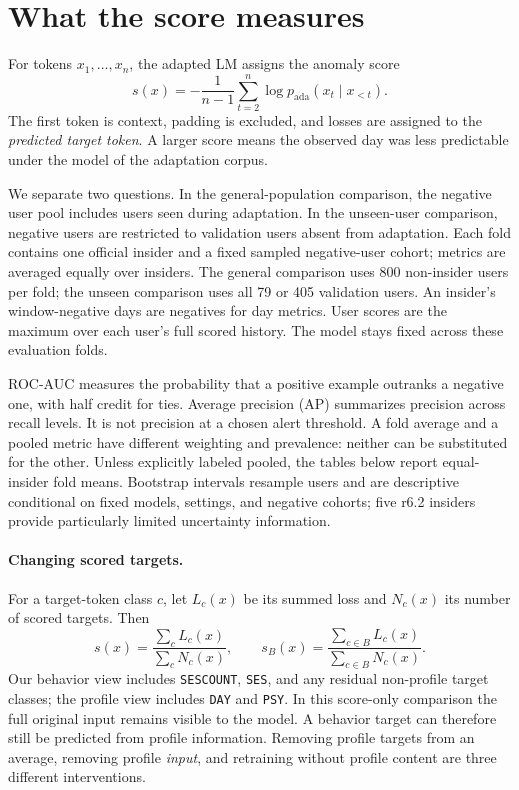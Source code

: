 \section{What the score measures}
\label{sec:evaluation}
For tokens $x_1,\ldots,x_n$, the adapted LM assigns the anomaly score
\begin{equation}
 s(x)=-\frac{1}{n-1}\sum_{t=2}^{n}\log p_{\mathrm{ada}}(x_t\mid x_{<t}).
\end{equation}
The first token is context, padding is excluded, and losses are assigned to the
\emph{predicted target token}. A larger score means the observed day was less
predictable under the model of the adaptation corpus.

We separate two questions. In the general-population comparison, the negative
user pool includes users seen during adaptation. In the unseen-user comparison,
negative users are restricted to validation users absent from adaptation. Each
fold contains one official insider and a fixed sampled negative-user cohort;
metrics are averaged equally over insiders. The general comparison uses 800
non-insider users per fold; the unseen comparison uses all 79 or 405 validation
users. An insider's window-negative days are negatives for day metrics. User
scores are the maximum over each user's full scored history. The model stays
fixed across these evaluation folds.

ROC-AUC measures the probability that a positive example outranks a negative
one, with half credit for ties. Average precision (AP) summarizes precision
across recall levels. It is not precision at a chosen alert threshold. A fold
average and a pooled metric have different weighting and prevalence: neither
can be substituted for the other. Unless explicitly labeled pooled, the tables
below report equal-insider fold means. Bootstrap intervals resample users and
are descriptive conditional on fixed models, settings, and negative cohorts;
five r6.2 insiders provide particularly limited uncertainty information.

\paragraph{Changing scored targets.}
For a target-token class $c$, let $L_c(x)$ be its summed loss and $N_c(x)$ its
number of scored targets. Then
\begin{equation}
 s(x)=\frac{\sum_c L_c(x)}{\sum_c N_c(x)},\qquad
 s_B(x)=\frac{\sum_{c\in B}L_c(x)}{\sum_{c\in B}N_c(x)}.
\label{eq:behavior-score}
\end{equation}
Our behavior view includes \texttt{SESCOUNT}, \texttt{SES}, and any residual
non-profile target classes; the profile view includes \texttt{DAY} and
\texttt{PSY}. In this score-only comparison the full original input remains
visible to the model. A behavior target can therefore still be predicted from
profile information. Removing profile targets from an average, removing profile
\emph{input}, and retraining without profile content are three different
interventions.

